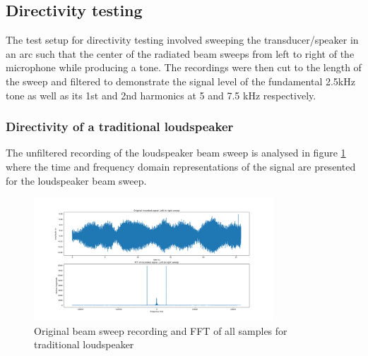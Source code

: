\subsection{Directivity testing}
The test setup for directivity testing involved sweeping the transducer/speaker in an arc such that the center of the radiated beam sweeps from left to right of the microphone while producing a tone. The recordings were then cut to the length of the sweep and filtered to demonstrate the signal level of the fundamental 2.5kHz tone as well as its 1st and 2nd harmonics at 5 and 7.5 kHz respectively.

\subsubsection{Directivity of a traditional loudspeaker}
The unfiltered recording of the loudspeaker beam sweep is analysed in figure \ref{fig:unfiltered_spkr_beamsweep} where the time and frequency domain representations of the signal are presented for the loudspeaker beam sweep.
\begin{figure}[ht!]
    \centering
    \includegraphics[width=0.8\textwidth]{Figures/Testing/BeamSweep/Classical_speaker/original_sig_fft_amp_skpr.png}
    \caption{Original beam sweep recording and FFT of all samples for traditional loudspeaker}
    \label{fig:unfiltered_spkr_beamsweep}
\end{figure}

